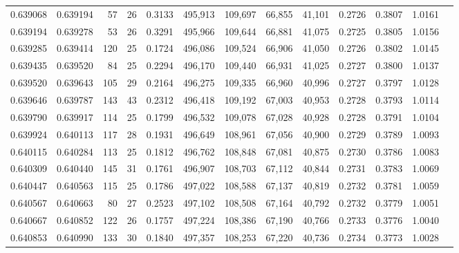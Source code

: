 \begin{tabular}{rrrrrrrrrrrrr}
0.639068 & 0.639194 &    57 &  26 &                                     0.3133 & 495,913 & 109,697 &  66,855 &  41,101 & 0.2726 & 0.3807 & 1.0161 \\
0.639194 & 0.639278 &    53 &  26 &                                     0.3291 & 495,966 & 109,644 &  66,881 &  41,075 & 0.2725 & 0.3805 & 1.0156 \\
0.639285 & 0.639414 &   120 &  25 &                                     0.1724 & 496,086 & 109,524 &  66,906 &  41,050 & 0.2726 & 0.3802 & 1.0145 \\
0.639435 & 0.639520 &    84 &  25 &                                     0.2294 & 496,170 & 109,440 &  66,931 &  41,025 & 0.2727 & 0.3800 & 1.0137 \\
0.639520 & 0.639643 &   105 &  29 &                                     0.2164 & 496,275 & 109,335 &  66,960 &  40,996 & 0.2727 & 0.3797 & 1.0128 \\
0.639646 & 0.639787 &   143 &  43 &                                     0.2312 & 496,418 & 109,192 &  67,003 &  40,953 & 0.2728 & 0.3793 & 1.0114 \\
0.639790 & 0.639917 &   114 &  25 &                                     0.1799 & 496,532 & 109,078 &  67,028 &  40,928 & 0.2728 & 0.3791 & 1.0104 \\
0.639924 & 0.640113 &   117 &  28 &                                     0.1931 & 496,649 & 108,961 &  67,056 &  40,900 & 0.2729 & 0.3789 & 1.0093 \\
0.640115 & 0.640284 &   113 &  25 &                                     0.1812 & 496,762 & 108,848 &  67,081 &  40,875 & 0.2730 & 0.3786 & 1.0083 \\
0.640309 & 0.640440 &   145 &  31 &                                     0.1761 & 496,907 & 108,703 &  67,112 &  40,844 & 0.2731 & 0.3783 & 1.0069 \\
0.640447 & 0.640563 &   115 &  25 &                                     0.1786 & 497,022 & 108,588 &  67,137 &  40,819 & 0.2732 & 0.3781 & 1.0059 \\
0.640567 & 0.640663 &    80 &  27 &                                     0.2523 & 497,102 & 108,508 &  67,164 &  40,792 & 0.2732 & 0.3779 & 1.0051 \\
0.640667 & 0.640852 &   122 &  26 &                                     0.1757 & 497,224 & 108,386 &  67,190 &  40,766 & 0.2733 & 0.3776 & 1.0040 \\
0.640853 & 0.640990 &   133 &  30 &                                     0.1840 & 497,357 & 108,253 &  67,220 &  40,736 & 0.2734 & 0.3773 & 1.0028 \\

\end{tabular}
